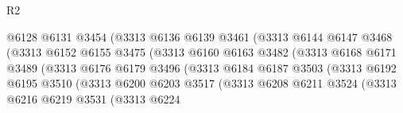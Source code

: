 \begin{lexlean}{R2}
\begin{coremodule}
                                    @6128
                                    @6131
                                    @3454
                                    (@3313
                                      @6136
                                      @6139
                                      @3461
                                      (@3313
                                        @6144
                                        @6147
                                        @3468
                                        (@3313
                                          @6152
                                          @6155
                                          @3475
                                          (@3313
                                            @6160
                                            @6163
                                            @3482
                                            (@3313
                                              @6168
                                              @6171
                                              @3489
                                              (@3313
                                                @6176
                                                @6179
                                                @3496
                                                (@3313
                                                  @6184
                                                  @6187
                                                  @3503
                                                  (@3313
                                                    @6192
                                                    @6195
                                                    @3510
                                                    (@3313
                                                      @6200
                                                      @6203
                                                      @3517
                                                      (@3313
                                                        @6208
                                                        @6211
                                                        @3524
                                                        (@3313
                                                          @6216
                                                          @6219
                                                          @3531
                                                          (@3313
                                                            @6224

\end{coremodule}
\end{lexlean}
